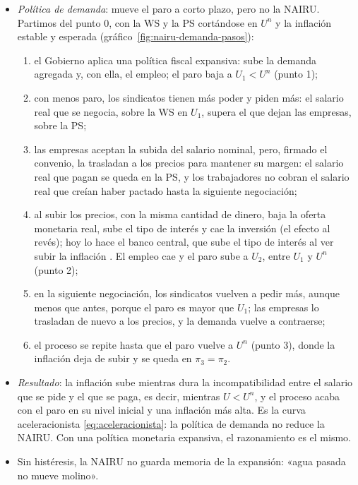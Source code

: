 \documentclass[11pt]{article}
\begin{document}
\begin{itemize}
\item \emph{Política de demanda}: mueve el paro a corto plazo, pero no la NAIRU. Partimos del punto 0, con la WS y la PS cortándose en $U^n$ y la inflación estable y esperada (gráfico~\ref{fig:nairu-demanda-pasos}):
  \begin{enumerate}
  \item el Gobierno aplica una política fiscal expansiva: sube la demanda agregada y, con ella, el empleo; el paro baja a $U_1<U^n$ (punto 1);
  \item con menos paro, los sindicatos tienen más poder y piden más: el salario real que se negocia, sobre la WS en $U_1$, supera el que dejan las empresas, sobre la PS;
  \item las empresas aceptan la subida del salario nominal, pero, firmado el convenio, la trasladan a los precios para mantener su margen: el salario real que pagan se queda en la PS, y los trabajadores no cobran el salario real que creían haber pactado hasta la siguiente negociación;
  \item al subir los precios, con la misma cantidad de dinero, baja la oferta monetaria real, sube el tipo de interés y cae la inversión (el efecto  al revés); hoy lo hace el banco central, que sube el tipo de interés al ver subir la inflación . El empleo cae y el paro sube a $U_2$, entre $U_1$ y $U^n$ (punto 2);
  \item en la siguiente negociación, los sindicatos vuelven a pedir más, aunque menos que antes, porque el paro es mayor que $U_1$; las empresas lo trasladan de nuevo a los precios, y la demanda vuelve a contraerse;
  \item el proceso se repite hasta que el paro vuelve a $U^n$ (punto 3), donde la inflación deja de subir y se queda en $\pi_3=\pi_2$.
  \end{enumerate}
\item \emph{Resultado}: la inflación sube mientras dura la incompatibilidad entre el salario que se pide y el que se paga, es decir, mientras $U<U^n$, y el proceso acaba con el paro en su nivel inicial y una inflación más alta. Es la curva aceleracionista \eqref{eq:aceleracionista}: la política de demanda no reduce la NAIRU. Con una política monetaria expansiva, el razonamiento es el mismo.
\item Sin histéresis, la NAIRU no guarda memoria de la expansión: «agua pasada no mueve molino».
\end{itemize}
\end{document}
